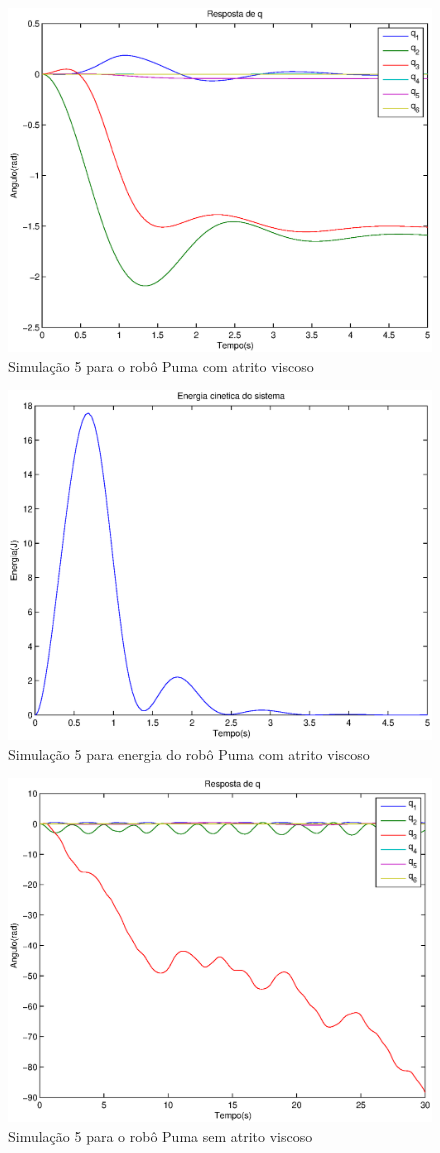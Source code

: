 \documentclass{article}
\begin{document}
\begin{figure}[H]
	\centering
	\includegraphics[width=0.8\linewidth]{../sime1odea}
	\caption{Simulação 5 para o robô Puma com atrito viscoso}
	\label{fig:pumasim5}
\end{figure}

\begin{figure}[H]
	\centering
	\includegraphics[width=0.8\linewidth]{../sime1kina}
	\caption{Simulação 5 para energia do robô Puma com atrito viscoso}
	\label{fig:energysim5}
\end{figure}

\begin{figure}[H]
	\centering
	\includegraphics[width=0.8\linewidth]{../longsims/sime1ode.eps}
	\caption{Simulação 5 para o robô Puma sem atrito viscoso}
	\label{fig:pumasim5nf}
\end{figure}
\end{document}
